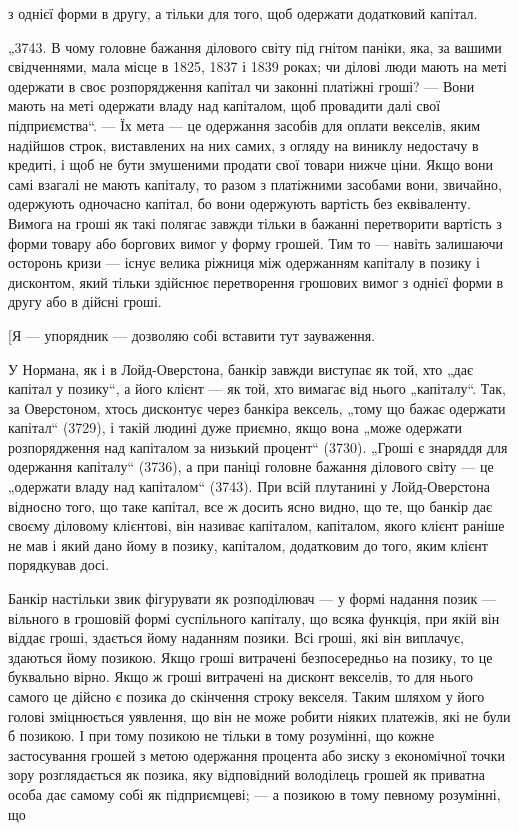 \parcont{}  %
з однієї форми в другу, а тільки для того, щоб одержати
додатковий капітал.

„3743. В чому головне бажання ділового світу під гнітом паніки, яка, за вашими свідченнями, мала
місце в 1825,
1837 і 1839 роках; чи ділові люди мають на меті одержати в
своє розпорядження капітал чи законні платіжні гроші? — Вони
мають на меті одержати владу над капіталом, щоб провадити
далі свої підприємства“. — Їх мета — це одержання засобів для
оплати векселів, яким надійшов строк, виставлених на них самих,
з огляду на виниклу недостачу в кредиті, і щоб не бути змушеними продати свої товари нижче ціни.
Якщо вони самі взагалі
не мають капіталу, то разом з платіжними засобами вони, звичайно, одержують одночасно капітал, бо
вони одержують вартість
без еквіваленту. Вимога на гроші як такі полягає завжди тільки в
бажанні перетворити вартість з форми товару або боргових вимог
у форму грошей. Тим то — навіть залишаючи осторонь кризи —
існує велика ріжниця між одержанням капіталу в позику і дисконтом, який тільки здійснює перетворення
грошових вимог
з однієї форми в другу або в дійсні гроші.

[Я — упорядник — дозволяю собі вставити тут зауваження.

У Нормана, як і в Лойд-Оверстона, банкір завжди виступає
як той, хто „дає капітал у позику“, а його клієнт — як той,
хто вимагає від нього „капіталу“. Так, за Оверстоном, хтось
дисконтує через банкіра вексель, „тому що бажає одержати
капітал“ (3729), і такій людині дуже приємно, якщо вона „може
одержати розпорядження над капіталом за низький процент“
(3730). „Гроші є знаряддя для одержання капіталу“ (3736), а
при паніці головне бажання ділового світу — це „одержати владу
над капіталом“ (3743). При всій плутанині у Лойд-Оверстона відносно того, що таке капітал, все ж
досить ясно видно, що те,
що банкір дає своєму діловому клієнтові, він називає капіталом,
капіталом, якого клієнт раніше не мав і який дано йому
в позику, капіталом, додатковим до того, яким клієнт порядкував досі.

Банкір настільки звик фігурувати як розподілювач — у формі
надання позик — вільного в грошовій формі суспільного капіталу,
що всяка функція, при якій він віддає гроші, здається йому
наданням позики. Всі гроші, які він виплачує, здаються йому
позикою. Якщо гроші витрачені безпосередньо на позику, то
це буквально вірно. Якщо ж гроші витрачені на дисконт векселів, то для нього самого це дійсно є
позика до скінчення строку
векселя. Таким шляхом у його голові зміцнюється уявлення, що
він не може робити ніяких платежів, які не були б позикою.
І при тому позикою не тільки в тому розумінні, що кожне
застосування грошей з метою одержання процента або зиску
з економічної точки зору розглядається як позика, яку відповідний володілець грошей як приватна
особа дає самому собі
як підприємцеві; — а позикою в тому певному розумінні, що
\parbreak{}  %
